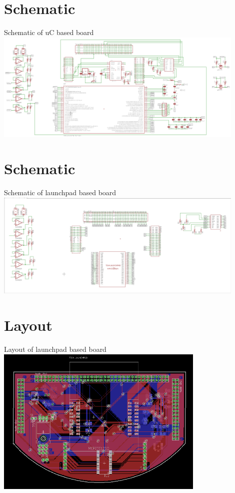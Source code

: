 \documentclass[10pt, a4paper]{beamer}
\begin{document}
\section{Schematic}
\begin{frame}{Schematic of uC based board}
{\includegraphics[width=12cm]{5.PNG}}
\end{frame}

\section{Schematic}
\begin{frame}{Schematic of launchpad based board}
{\includegraphics[width=12cm]{6.PNG}}
\end{frame}

\section{Layout}
\begin{frame}{Layout of launchpad based board}
{\includegraphics[width=10cm]{8.PNG}}
\end{frame}
\end{document}
